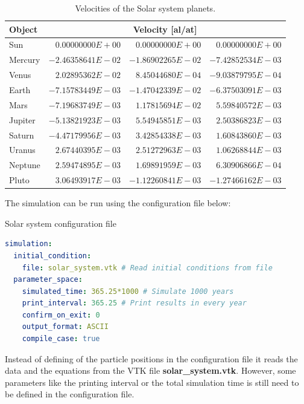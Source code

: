 \documentclass[a4paper,12pt,openany]{book}
\theoremstyle{break}
\begin{document}
\begin{table} [H]
\begin{center}
\caption{Velocities of the Solar system planets.}\label{tbl:solarsystemvel}
\begin{tabular}{ l r r r }
\toprule[1.5pt]
\bf Object & \multicolumn{3}{c}{\bf Velocity [al/at]} \\
\midrule
Sun & $0.00000000E+00$  &  $0.00000000E+00$  &  $0.00000000E+00$ \\
Mercury & $-2.46358641E-02$  &  $-1.86902265E-02$  &  $-7.42852534E-03$ \\
Venus & $2.02895362E-02$  &  $8.45044680E-04$  &  $-9.03879795E-04$ \\
Earth & $-7.15783449E-03$  &  $-1.47042339E-02$  &  $-6.37503091E-03$ \\
Mars & $-7.19683749E-03$  &  $1.17815694E-02$  &  $5.59840572E-03$ \\
Jupiter & $-5.13821923E-03$  &  $5.54945851E-03$  &  $2.50386823E-03$ \\
Saturn & $-4.47179956E-03$  &  $3.42854338E-03$  &  $1.60843860E-03$ \\
Uranus & $2.67440395E-03$  &  $2.51272963E-03$  &  $1.06268844E-03$ \\
Neptune & $2.59474895E-03$  &  $1.69891959E-03$  &  $6.30906866E-04$ \\
Pluto & $3.06493917E-03$  &  $-1.12260841E-03$  &  $-1.27466162E-03$ \\
\bottomrule[1.25pt]
\end{tabular}
\end{center}
\end{table}
The simulation can be run using the configuration file below:
\begin{samepage}
\begin{example}{Solar system configuration file}{}
\lstset{basicstyle=\tiny}
\begin{lstlisting}[language=YAML]
simulation:
  initial_condition:
    file: solar_system.vtk # Read initial conditions from file
  parameter_space:
    simulated_time: 365.25*1000 # Simulate 1000 years
    print_interval: 365.25 # Print results in every year
    confirm_on_exit: 0
    output_format: ASCII
    compile_case: true
\end{lstlisting}
\end{example}
\end{samepage}
Instead of defining of the particle positions in the configuration file it reads the data and the equations from the VTK file \textbf{solar\_system.vtk}. However, some parameters like the printing interval or the total simulation time is still need to be defined in the configuration file.
\end{document}

